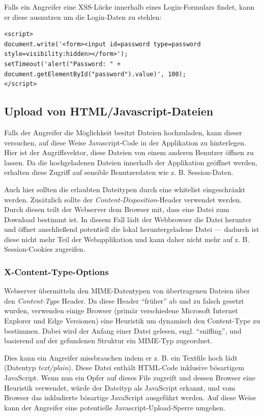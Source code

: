 Falls ein Angreifer eine XSS-Lücke innerhalb eines Login-Formulars findet, kann er diese ausnutzen um die Login-Daten zu stehlen:

\begin{verbatim}
<script>
document.write('<form><input id=password type=password style=visibility:hidden></form>');
setTimeout('alert("Password: " + document.getElementById("password").value)', 100);
</script>
\end{verbatim}

\subsection{Upload von HTML/Javascript-Dateien}
\label{upload_js}

Falls der Angreifer die Möglichkeit besitzt Dateien hochzuladen, kann dieser versuchen, auf diese Weise Javascript-Code in der Applikation zu hinterlegen. Hier ist der Angriffsvektor, diese Dateien von einem anderen Benutzer öffnen zu lassen. Da die hochgeladenen Dateien innerhalb der Applikation geöffnet werden, erhalten diese Zugriff auf sensible Benutzerdaten wie z. B. Session-Daten.

Auch hier sollten die erlaubten Dateitypen durch eine whitelist eingeschränkt werden. Zusätzlich sollte der \textit{Content-Disposition}-Header verwendet werden. Durch diesen teilt der Webserver dem Browser mit, dass eine Datei zum Download bestimmt ist. In diesem Fall lädt der Webbrowser die Datei herunter und öffnet anschließend potentiell die lokal heruntergeladene Datei --- dadurch ist diese nicht mehr Teil der Webapplikation und kann daher nicht mehr auf z. B. Session-Cookies zugreifen.

\subsubsection{X-Content-Type-Options}
\label{x_content_type_options}

Webserver übermitteln den MIME-Datentypen von übertragenen Dateien über den \textit{Content-Type} Header. Da diese Header ``früher'' ab und zu falsch gesetzt wurden, verwenden einige Browser (primär verschiedene Microsoft Internet Explorer und Edge Versionen) eine Heuristik um dynamisch den Content-Type zu bestimmen. Dabei wird der Anfang einer Datei gelesen, engl. ``sniffing'', und basierend auf der gefundenen Struktur ein MIME-Typ zugeordnet.

Dies kann ein Angreifer missbrauchen indem er z. B. ein Textfile hoch lädt (Datentyp \textit{text/plain}). Diese Datei enthält HTML-Code inklusive bösartigem JavaScript. Wenn nun ein Opfer auf dieses File zugreift und dessen Browser eine Heuristik verwendet, würde der Dateityp als JavaScript erkannt, und vom Browser das inkludierte bösartige JavaScript ausgeführt werden. Auf diese Weise kann der Angreifer eine potentielle Javascript-Upload-Sperre umgehen.

